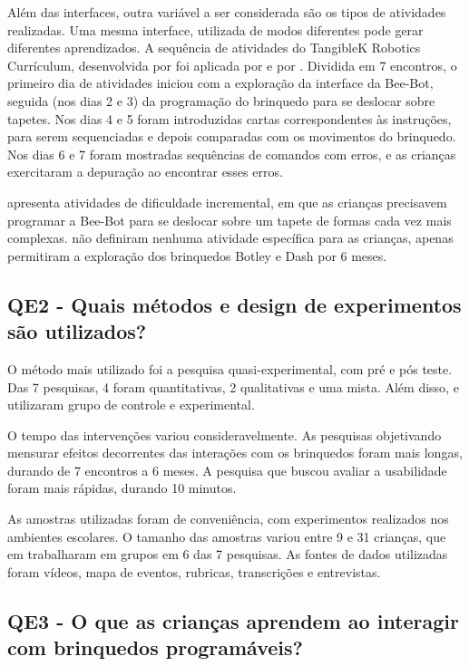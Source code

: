 Além das interfaces, outra variável a ser considerada são os tipos de atividades realizadas. Uma mesma interface, utilizada de modos diferentes pode gerar diferentes aprendizados. A sequência de atividades do TangibleK Robotics Currículum, desenvolvida por  foi aplicada por  e por . Dividida em 7 encontros, o primeiro dia de atividades iniciou com a exploração da interface da Bee-Bot, seguida (nos dias 2 e 3) da programação do brinquedo para se deslocar sobre tapetes. Nos dias 4 e 5 foram introduzidas cartas correspondentes às instruções, para serem sequenciadas e depois comparadas com os movimentos do brinquedo. Nos dias 6 e 7 foram mostradas sequências de comandos com erros, e as crianças exercitaram a depuração ao encontrar esses erros.

 apresenta atividades de dificuldade incremental, em que as crianças precisavem programar a Bee-Bot para se deslocar sobre um tapete de formas cada vez mais complexas.  não definiram nenhuma atividade específica para as crianças, apenas permitiram a exploração dos brinquedos Botley e Dash por 6 meses.

\subsection{QE2 - Quais métodos e design de experimentos são utilizados?}

O método mais utilizado foi a pesquisa quasi-experimental, com pré e pós teste. Das 7 pesquisas, 4 foram quantitativas, 2 qualitativas e uma mista. Além disso,  e  utilizaram grupo de controle e experimental.

O tempo das intervenções variou consideravelmente. As pesquisas objetivando mensurar efeitos decorrentes das interações com os brinquedos foram mais longas, durando de 7 encontros a 6 meses. A pesquisa que buscou avaliar a usabilidade foram mais rápidas, durando 10 minutos.

As amostras utilizadas foram de conveniência, com experimentos realizados nos ambientes escolares. O tamanho das amostras variou entre 9 e 31 crianças, que em trabalharam em grupos em 6 das 7 pesquisas. As fontes de dados utilizadas foram vídeos, mapa de eventos, rubricas, transcrições e entrevistas. 

\subsection{QE3 - O que as crianças aprendem ao interagir com brinquedos programáveis?}

